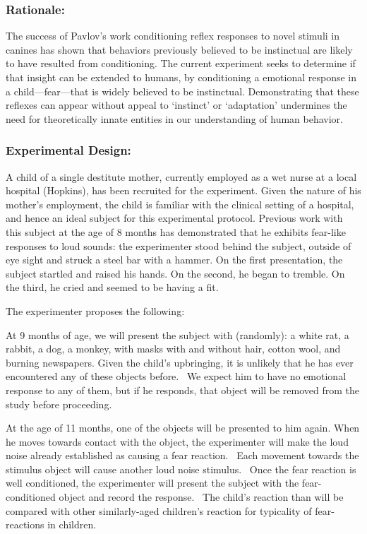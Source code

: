 \subsubsection{Rationale:}
\label{rationale:}

The success of Pavlov's work conditioning reflex responses to novel stimuli in canines has shown that behaviors previously believed to be instinctual are likely to have resulted from conditioning. The current experiment seeks to determine if that insight can be extended to humans, by conditioning a emotional response in a child—fear—that is widely believed to be instinctual. Demonstrating that these reflexes can appear without appeal to `instinct' or `adaptation' undermines the need for theoretically innate entities in our understanding of human behavior.

\subsubsection{Experimental Design:}
\label{experimentaldesign:}

A child of a single destitute mother, currently employed as a wet nurse at a local hospital (Hopkins), has been recruited for the experiment. Given the nature of his mother's employment, the child is familiar with the clinical setting of a hospital, and hence an ideal subject for this experimental protocol. Previous work with this subject at the age of 8 months has demonstrated that he exhibits fear-like responses to loud sounds: the experimenter stood behind the subject, outside of eye sight and struck a steel bar with a hammer. On the first presentation, the subject startled and raised his hands. On the second, he began to tremble. On the third, he cried and seemed to be having a fit.

The experimenter proposes the following:

At 9 months of age, we will present the subject with (randomly): a white rat, a rabbit, a dog, a monkey, with masks with and without hair, cotton wool, and burning newspapers. Given the child's upbringing, it is unlikely that he has ever encountered any of these objects before.  We expect him to have no emotional response to any of them, but if he responds, that object will be removed from the study before proceeding.

At the age of 11 months, one of the objects will be presented to him again. When he moves towards contact with the object, the experimenter will make the loud noise already established as causing a fear reaction.  Each movement towards the stimulus object will cause another loud noise stimulus.  Once the fear reaction is well conditioned, the experimenter will present the subject with the fear-conditioned object and record the response.  The child's reaction than will be compared with other similarly-aged children's reaction for typicality of fear-reactions in children.

